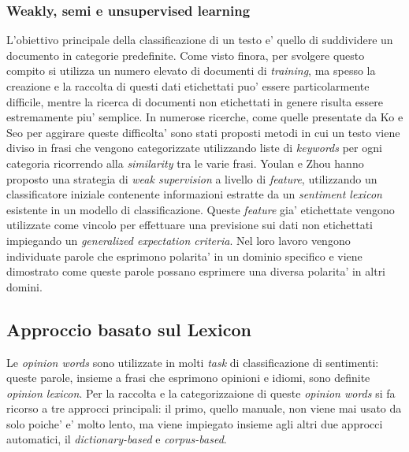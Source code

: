 \documentclass[a4paper,12pt,openright,twoside]{report}
\theoremstyle{definition}
\begin{document}
\subsubsection{Weakly, semi e unsupervised learning}
L'obiettivo principale della classificazione di un testo e' quello di suddividere un documento in categorie
predefinite. Come visto finora, per svolgere questo compito si utilizza un numero elevato di documenti di \emph{training},
 ma spesso la creazione e la raccolta di questi dati etichettati puo' essere particolarmente difficile,
 mentre
la ricerca di documenti non etichettati in genere risulta essere estremamente piu' semplice.
In numerose ricerche, come quelle presentate da Ko e Seo %
per aggirare queste difficolta' sono stati proposti metodi in cui un testo viene diviso in frasi che vengono categorizzate utilizzando liste
di \emph{keywords} per ogni categoria ricorrendo alla \emph{similarity} tra le varie frasi.
Youlan e Zhou %
hanno proposto una strategia di \emph{weak supervision} a  livello di \emph{feature},
utilizzando un classificatore iniziale contenente informazioni estratte da un \emph{sentiment lexicon} esistente
in un modello di classificazione. Queste \emph{feature} gia' etichettate vengono utilizzate come vincolo per effettuare
una previsione sui dati non etichettati impiegando un \emph{generalized expectation criteria}.
Nel loro lavoro vengono individuate parole che esprimono polarita' in un dominio specifico e viene dimostrato
come queste parole possano esprimere una diversa polarita' in altri domini.
\subsection{Approccio basato sul Lexicon}
Le \emph{opinion words} sono utilizzate in molti \emph{task} di classificazione di sentimenti: queste parole,
insieme a frasi che esprimono opinioni e idiomi, sono definite \emph{opinion lexicon}. 
Per la raccolta e la categorizzaione di queste \emph{opinion words} si 
fa ricorso a tre approcci principali: il primo,
quello manuale, non viene mai usato da solo poiche' e' molto lento, ma viene impiegato insieme agli
altri due approcci automatici, il \emph{dictionary-based} e \emph{corpus-based}.
\end{document}
